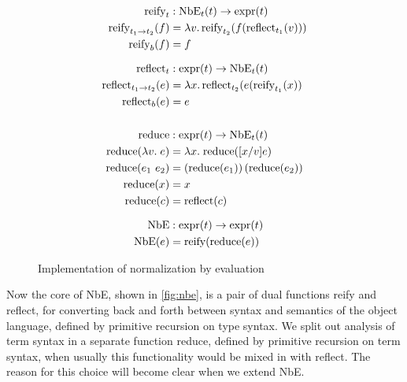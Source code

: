 \documentclass[a4paper,USenglish,cleveref,autoref,thm-restate]{lipics-v2021}
\newcommand{\defeq}{=}
\begin{document}
\begin{figure}%
  \begin{subfigure}[b]{0.5\textwidth}
    \begin{align*}
      \text{reify}_t & : \text{NbE}_t(t) \to \text{expr}(t) \\
      \text{reify}_{t_1 \to t_2}(f) & \defeq \lambda v.\,\text{reify}_{t_2}(f(\text{reflect}_{t_1}(v))) \\
      \text{reify}_{b}(f) & \defeq f \\ \noalign{\vskip7pt}
      \text{reflect}_t & : \text{expr}(t) \to \text{NbE}_t(t) \\
      \text{reflect}_{t_1\to t_2}(e) & \defeq \lambda x.\,\text{reflect}_{t_2}(e(\text{reify}_{t_1}(x)) \\
      \text{reflect}_{b}(e) & \defeq e \\ \noalign{\vskip7pt}
    \end{align*}
  \end{subfigure}
  \begin{subfigure}[b]{0.5\textwidth}
    \begin{align*}
      \text{reduce} & : \text{expr}(t) \to \text{NbE}_t(t) \\
      \text{reduce}(\lambda v. \; e) & \defeq \lambda x. \; \text{reduce}([x/v]e) \\
      \text{reduce}(e_1~e_2) & \defeq \left(\text{reduce}(e_1)\right)(\text{reduce}(e_2)) \\
      \text{reduce}(x) & \defeq x \\
      \text{reduce}(c) & \defeq \text{reflect}(c) \\ \noalign{\vskip7pt}
      \text{NbE} & : \text{expr}(t) \to \text{expr}(t) \\
      \text{NbE}(e) & \defeq \text{reify}(\text{reduce}(e))
    \end{align*}
  \end{subfigure}
\caption{\label{fig:nbe}Implementation of normalization by evaluation}
\end{figure}

Now the core of NbE, shown in \autoref{fig:nbe}, is a pair of dual functions reify and reflect, for converting back and forth between syntax and semantics of the object language, defined by primitive recursion on type syntax.
We split out analysis of term syntax in a separate function reduce, defined by primitive recursion on term syntax, when usually this functionality would be mixed in with reflect.
The reason for this choice will become clear when we extend NbE.
\end{document}
